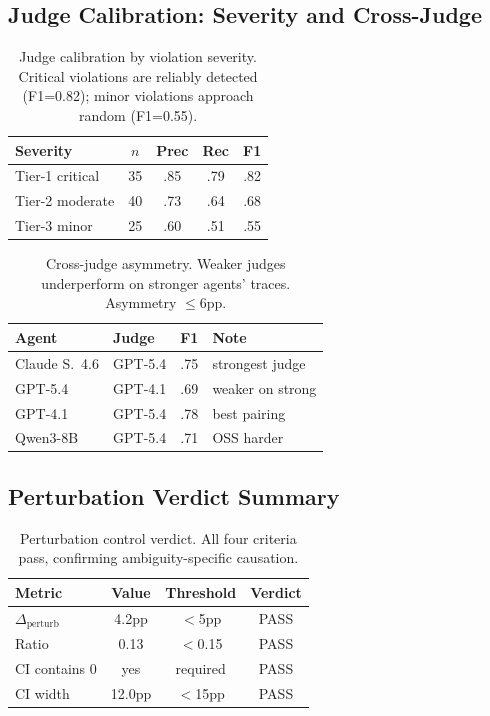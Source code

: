 \documentclass[11pt]{article}
\begin{document}
\subsection{Judge Calibration: Severity and Cross-Judge}

\begin{table}[h]
\centering
\small
\begin{tabular}{lcccc}
\toprule
\textbf{Severity} & $n$ & \textbf{Prec} & \textbf{Rec} & \textbf{F1} \\
\midrule
Tier-1 critical & 35 & .85 & .79 & .82 \\
Tier-2 moderate & 40 & .73 & .64 & .68 \\
Tier-3 minor & 25 & .60 & .51 & .55 \\
\bottomrule
\end{tabular}
\caption{Judge calibration by violation severity. Critical violations are reliably detected (F1=0.82); minor violations approach random (F1=0.55).}
\label{tab:judge_severity}
\end{table}

\begin{table}[h]
\centering
\small
\begin{tabular}{llcl}
\toprule
\textbf{Agent} & \textbf{Judge} & \textbf{F1} & \textbf{Note} \\
\midrule
Claude S.\ 4.6 & GPT-5.4 & .75 & strongest judge \\
GPT-5.4 & GPT-4.1 & .69 & weaker on strong \\
GPT-4.1 & GPT-5.4 & .78 & best pairing \\
Qwen3-8B & GPT-5.4 & .71 & OSS harder \\
\bottomrule
\end{tabular}
\caption{Cross-judge asymmetry. Weaker judges underperform on stronger agents' traces. Asymmetry $\leq$6pp.}
\label{tab:cross_judge}
\end{table}

\subsection{Perturbation Verdict Summary}

\begin{table}[h]
\centering
\small
\begin{tabular}{lccc}
\toprule
\textbf{Metric} & \textbf{Value} & \textbf{Threshold} & \textbf{Verdict} \\
\midrule
$\Delta_{\text{perturb}}$ & 4.2pp & $<$5pp & PASS \\
Ratio & 0.13 & $<$0.15 & PASS \\
CI contains 0 & yes & required & PASS \\
CI width & 12.0pp & $<$15pp & PASS \\
\bottomrule
\end{tabular}
\caption{Perturbation control verdict. All four criteria pass, confirming ambiguity-specific causation.}
\label{tab:perturb_verdict}
\end{table}
\end{document}
